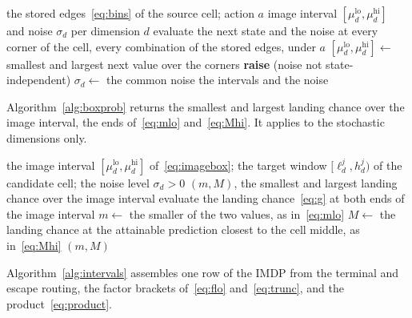 \documentclass[11pt,a4paper]{article}
\theoremstyle{plain}
\theoremstyle{remark}
\begin{document}
	\begin{algorithm}[H]
		\caption{$\textsc{ImageBox}$: corner evaluation of the image box, with the noise check.}
		\label{alg:imagebox}
		\begin{algorithmic}[1]
			\Require the stored edges~\eqref{eq:bins} of the source cell; action $a$
			\Ensure image interval $[\mu^{\text{lo}}_d, \mu^{\text{hi}}_d]$ and noise $\sigma_d$ per dimension $d$
			\State evaluate the next state and the noise at every corner of the cell, every combination of the stored edges, under $a$
			\State $[\mu^{\text{lo}}_d, \mu^{\text{hi}}_d] \gets$ smallest and largest next value over the corners
			 \textbf{raise} (noise not state-independent) \EndIf
			\State $\sigma_d \gets$ the common noise
			\EndFor
			\State \Return the intervals and the noise
		\end{algorithmic}
	\end{algorithm}
	

	Algorithm~\ref{alg:boxprob} returns the smallest and largest
	landing chance over the image interval, the ends
	of~\eqref{eq:mlo} and~\eqref{eq:Mhi}. It applies to the
	stochastic dimensions only.
	
	\begin{algorithm}[H]
		\caption{$\textsc{BoxProbRange}$: the range of the landing chance over the image interval.}
		\label{alg:boxprob}
		\begin{algorithmic}[1]
			\Require the image interval $[\mu_d^{\text{lo}}, \mu_d^{\text{hi}}]$ of~\eqref{eq:imagebox}; the target window $[\ell^j_d, h^j_d)$ of the candidate cell; the noise level $\sigma_d > 0$
			\Ensure $(m, M)$, the smallest and largest landing chance over the image interval
			\State evaluate the landing chance~\eqref{eq:g} at both ends of the image interval
			\State $m \gets$ the smaller of the two values, as in~\eqref{eq:mlo}
			\State $M \gets$ the landing chance at the attainable prediction closest to the cell middle, as in~\eqref{eq:Mhi}
			\State \Return $(m, M)$
		\end{algorithmic}
	\end{algorithm}


	Algorithm~\ref{alg:intervals} assembles one row of the IMDP from
	the terminal and escape routing, the factor brackets
	of~\eqref{eq:flo} and~\eqref{eq:trunc}, and the
	product~\eqref{eq:product}.
	
\end{document}
